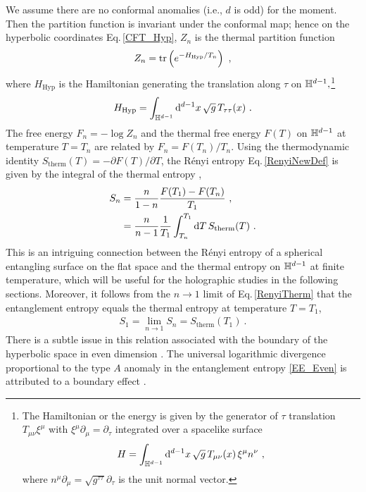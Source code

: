 We assume there are no conformal anomalies (i.e., $d$ is odd) for the moment. Then the partition function is invariant under the conformal map; hence on the hyperbolic coordinates Eq.\,\eqref{CFT_Hyp}, $Z_n$ is the thermal partition function
\begin{align}\label{PFHyp}
Z_n = {\rm tr} \left(e^{-H_\text{Hyp} /T_n}\right) \ ,
\end{align}
where $H_\text{Hyp}$ is the Hamiltonian generating the translation along $\tau$ on $\mathbb{H}^{d-1},$\footnote{The Hamiltonian or the energy is given by the generator of $\tau$ translation $T_{\mu\nu}\xi^\mu$ with $\xi^\mu\partial_\mu = \partial_\tau$ integrated over a spacelike surface
\begin{align}
H  =\int_{\mathbb{H}^{d-1}}\mathrm{d}^{d-1}x\, \sqrt{g} \, T_{\mu\nu}(x)\,\xi^\mu n^\nu \ ,
\end{align}
where $n^\mu\partial_\mu = \sqrt{g^{\tau\tau}} \partial_\tau$ is the unit normal vector.
}
\begin{align}\label{ModularHamiltonian}
H_\text{Hyp}  =  \int_{\mathbb{H}^{d-1}}\mathrm{d}^{d-1}x\, \sqrt{g} \, T_{\tau\tau}(x) \ .
\end{align}
The free energy $F_n = -\log Z_n$ and the thermal free energy $F(T)$ on $\mathbb{H}^{d-1}$ at temperature $T=T_n$ are related by $F_n = F(T_n)/T_n$. 
Using the thermodynamic identity $S_\text{therm}(T) = - \partial F(T)/\partial T$, the R{\'e}nyi entropy Eq.\,\eqref{RenyiNewDef} is given by the integral of the thermal entropy \cite{Hung:2011nu},
\begin{align}\label{RenyiTherm}
\begin{aligned}
S_n &= \frac{n}{1-n} \frac{F(T_1) - F(T_n)}{T_1} \ , \\
	&= \frac{n}{n-1}\frac{1}{T_1} \int_{T_n}^{T_1} \mathrm{d} T \, S_\text{therm}(T) \ .
\end{aligned}
\end{align}
This is an intriguing connection between the R{\'e}nyi entropy of a spherical entangling surface on the flat space and the thermal entropy on $\mathbb{H}^{d-1}$ at finite temperature, which will be useful for the holographic studies in the following sections.
Moreover, it follows from the $n\to 1$ limit of Eq.\,\eqref{RenyiTherm} that the entanglement entropy equals the thermal entropy at temperature $T= T_1$,
\begin{align}\label{RenyiAndTherm}
S_1 = \lim_{n\to 1} S_n = S_\text{therm}(T_1) \ .
\end{align}
There is a subtle issue in this relation associated with the boundary of the hyperbolic space in even dimension \cite{Casini:2011kv}.
The universal logarithmic divergence proportional to the type $A$ anomaly in the entanglement entropy \eqref{EE_Even} is attributed to a boundary effect \cite{Herzog:2015ioa,Herzog:2016kno}.





